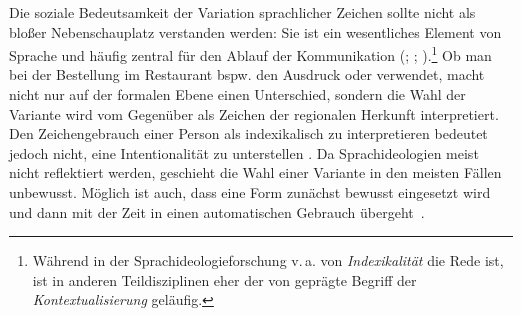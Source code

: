 Die soziale Bedeutsamkeit der Variation sprachlicher Zeichen sollte nicht als bloßer Nebenschauplatz verstanden werden: 
Sie ist ein wesentliches Element von Sprache und häufig zentral für den Ablauf der Kommunikation (\citealp[s.][19]{Silverstein.1976}; \citealp[131]{Gumperz.1982}; \citealp[68]{Eckert.2016}).\footnote{Während in der Sprachideologieforschung v.\,a. von \textit{Indexikalität} die Rede ist, ist in anderen Teildisziplinen eher der von \citet{Gumperz.1982} geprägte Begriff der \textit{Kontextualisierung} geläufig.}
Ob man bei der Bestellung im Restaurant bspw. den Ausdruck  oder  verwendet, macht nicht nur auf der formalen Ebene einen Unterschied, sondern die Wahl der Variante wird vom Gegenüber als Zeichen der regionalen Herkunft interpretiert. 
Den Zeichengebrauch einer Person als indexikalisch zu interpretieren bedeutet jedoch nicht, eine Intentionalität zu unterstellen \citep[s.][78]{Eckert.2016}. 
Da Sprachideologien meist nicht reflektiert werden, geschieht die Wahl einer Variante in den meisten Fällen unbewusst. 
Möglich ist auch, dass eine Form zun{\"a}chst bewusst eingesetzt wird und dann mit der Zeit in einen automatischen Gebrauch {\"u}bergeht~\citep[s.][79]{Eckert.2016}.

